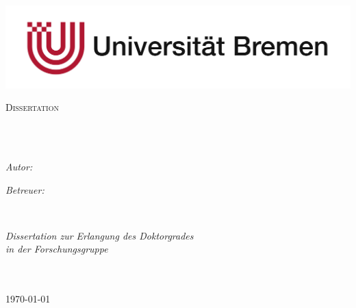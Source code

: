 \documentclass[11pt,english,onehalfspacing,headsepline]{MastersDoctoralThesis}
\author{Kai Michael \textsc{Renken}} %
\begin{document}
\frontmatter %

\pagestyle{plain} %


\begin{titlepage}
\begin{center}

\includegraphics[scale=0.3]{Logo.jpg} %

\textsc{\Large Dissertation}\\[0.5cm] %

\HRule \\[0.4cm] %
{\huge \bfseries \ttitle\par}\vspace{0.4cm} %
\HRule \\[1.5cm] %
 
\begin{minipage}[t]{0.4\textwidth}
\begin{flushleft} \large
\emph{Autor:}\\
{\authorname} %
\end{flushleft}
\end{minipage}
\begin{minipage}[t]{0.4\textwidth}
\begin{flushright} \large
\emph{Betreuer:} \\
{\supname} %
\end{flushright}
\end{minipage}\\[3cm]
 
\vfill

\large \textit{Dissertation zur Erlangung des Doktorgrades \degreename}\\[0.3cm] %
\textit{in der Forschungsgruppe}\\[0.4cm]
\groupname\\\deptname\\[2cm] %
 
\vfill

{\large \myformat\today}\\[4cm] %
 
\vfill
\end{center}
\end{titlepage}
\end{document}
